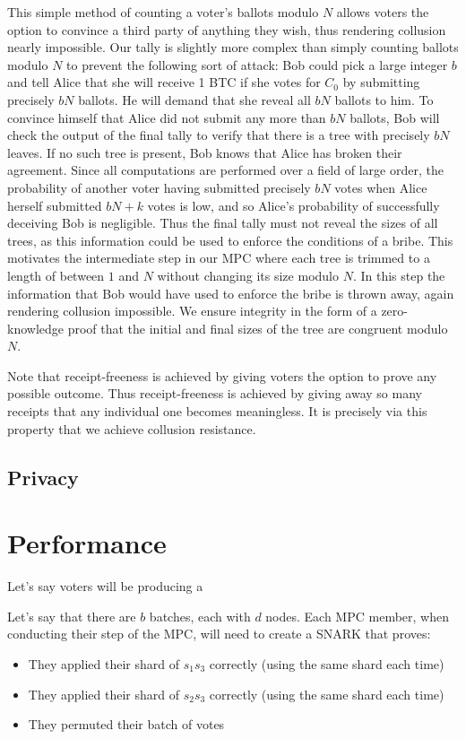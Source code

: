 \documentclass{article}
\begin{document}
This simple method of counting a voter's ballots modulo $N$ allows voters the option to convince a third party of anything they wish, thus rendering collusion nearly impossible.  Our tally is slightly more complex than simply counting ballots modulo $N$ to prevent the following sort of attack: Bob could pick a large integer $b$ and tell Alice that she will receive 1 BTC if she votes for $C_0$ by submitting precisely $bN$ ballots.  He will demand that she reveal all $bN$ ballots to him.  To convince himself that Alice did not submit any more than $bN$ ballots, Bob will check the output of the final tally to verify that there is a tree with precisely $bN$ leaves.  If no such tree is present, Bob knows that Alice has broken their agreement.  Since all computations are performed over a field of large order, the probability of another voter having submitted precisely $bN$ votes when Alice herself submitted $bN+k$ votes is low, and so Alice's probability of successfully deceiving Bob is negligible.  Thus the final tally must not reveal the sizes of all trees, as this information could be used to enforce the conditions of a bribe.  This motivates the intermediate step in our MPC where each tree is trimmed to a length of between $1$ and $N$ without changing its size modulo $N$.  In this step the information that Bob would have used to enforce the bribe is thrown away, again rendering collusion impossible.  We ensure integrity in the form of a zero-knowledge proof that the initial and final sizes of the tree are congruent modulo $N$.

Note that receipt-freeness is achieved by giving voters the option to prove any possible outcome.  Thus receipt-freeness is achieved by giving away so many receipts that any individual one becomes meaningless.  It is precisely via this property that we achieve collusion resistance.

\subsection{Privacy}


\section{Performance}
Let's say voters will be producing a 

Let's say that there are $b$ batches, each with $d$ nodes. Each MPC member, when conducting their step of the MPC, will need to create a SNARK that proves:
\begin{itemize}
    \item They applied their shard of $s_1s_3$ correctly (using the same shard each time)
    \item They applied their shard of $s_2s_3$ correctly (using the same shard each time)
    \item They permuted their batch of votes
\end{itemize}
\end{document}
